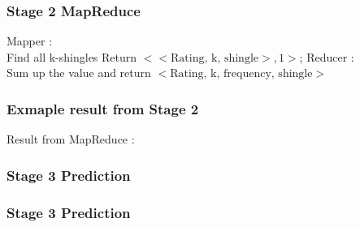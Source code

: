 \documentclass[11pt]{beamer}
\begin{document}
\begin{frame}
\frametitle{Stage 2 MapReduce}

\begin{tcolorbox}[colback=blue!5,colframe=blue!40!black,title=\textbf{Algorithm 2}: MapReduce]
\begin{algorithm}[H]
	Mapper :\\
	{
		{
		\label{forins}
		Find all k-shingles\;
			{
			Return \(<<\mbox{Rating, k, shingle}>,1>\);	
			}
   		}
	}
	Reducer :\\
	Sum up the value and return \(<\mbox{Rating, k, frequency, shingle}>\)\;
\end{algorithm}
\end{tcolorbox}
\end{frame}

\begin{frame}
\frametitle{Exmaple result from Stage 2}

Result from MapReduce : \\
\vspace{5mm}

\end{frame}


\begin{frame}
\frametitle{Stage 3 Prediction}

\begin{tcolorbox}[colback=blue!5,colframe=blue!40!black,title=\textbf{Algorithm 3}: prediction?]

\end{tcolorbox}

\end{frame}

\begin{frame}
\frametitle{Stage 3 Prediction}

\end{frame}
\end{document}
